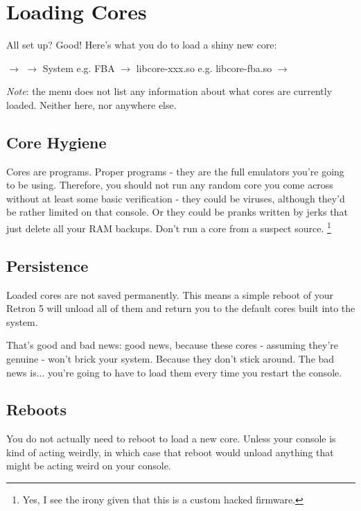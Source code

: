 \documentclass[english]{retronlabo-manual}
\begin{document}
\section{Loading Cores}

All set up? Good! Here's what you do to load a shiny new core:

 $\rightarrow$  $\rightarrow$ System e.g. FBA $\rightarrow$ libcore-xxx.so e.g. libcore-fba.so $\rightarrow$ 

\emph{Note}: the menu does not list any information about what cores are currently loaded. Neither here, nor anywhere else.


\subsection{Core Hygiene}

Cores are programs. Proper programs - they are the full emulators you're going to be using. Therefore, you should not run any random core you come across without at least some basic verification - they could be viruses, although they'd be rather limited on that console. Or they could be pranks written by jerks that just delete all your RAM backups. Don't run a core from a suspect source. \footnote{Yes, I see the irony given that this is a custom hacked firmware.}

\subsection{Persistence}

Loaded cores are not saved permanently. This means a simple reboot of your Retron 5 will unload all of them and return you to the default cores built into the system.

That's good and bad news: good news, because these cores - assuming they're genuine - won't brick your system. Because they don't stick around. The bad news is... you're going to have to load them every time you restart the console.

\subsection{Reboots}

You do not actually need to reboot to load a new core. Unless your console is kind of acting weirdly, in which case that reboot would unload anything that might be acting weird on your console.
\end{document}
